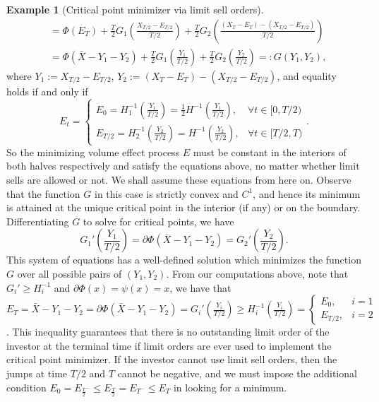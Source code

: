 \documentclass[openany,oneside]{article}
\theoremstyle{definition}
\newtheorem{eg}[thm]{Example}
\theoremstyle{remark}
\begin{document}
\begin{eg}[Critical point minimizer via limit sell orders]
\begin{align*}
&= \Phi(E_T) + \frac{T}{2} G_1\left(\frac{X_{T/2} - E_{T/2}}{T/2}\right) + \frac{T}{2} G_2\left(\frac{(X_T - E_T) - (X_{T/2} - E_{T/2})}{T/2}\right) \\
&= \Phi(\bar{X}-Y_1-Y_2) + \frac{T}{2} G_1\left(\frac{Y_1}{T/2}\right) + \frac{T}{2} G_2\left(\frac{Y_2}{T/2}\right) =: G(Y_1, Y_2),
\end{align*}
where $Y_1 := X_{T/2} - E_{T/2}$, $Y_2 := (X_T - E_T) - (X_{T/2} - E_{T/2})$, and equality holds if and only if
$$E_t =
\begin{cases} E_0 = H_1^{-1}\left( \frac{Y_1}{T/2} \right) = \frac{1}{2} H^{-1}\left( \frac{Y_1}{T/2} \right) , & \forall t\in[0,T/2) \\
E_{T/2} = H_2^{-1}\left( \frac{Y_2}{T/2} \right) = H^{-1}\left( \frac{Y_2}{T/2} \right), & \forall t\in[T/2,T)
\end{cases}.$$
So the minimizing volume effect process $E$ must be constant in the interiors of both halves respectively and satisfy the equations above, no matter whether limit sells are allowed or not. We shall assume these equations from here on. Observe that the function $G$ in this case is strictly convex and $C^1$, and hence its minimum is attained at the unique critical point in the interior (if any) or on the boundary. Differentiating $G$ to solve for critical points, we have
$$G_1'\left(\frac{Y_1}{T/2}\right) = \partial \Phi(\bar{X}-Y_1-Y_2) = G_2'\left(\frac{Y_2}{T/2}\right).$$
This system of equations has a well-defined solution which minimizes the function $G$ over all possible pairs of $(Y_1, Y_2)$. From our computations above, note that $G_i' \ge H_i^{-1}$ and $\partial \Phi(x) = \psi(x) = x$, we have that $E_T = \bar{X}-Y_1-Y_2 = \partial \Phi(\bar{X}-Y_1-Y_2) = G_i'\left(\frac{Y_i}{T/2}\right) \ge H_i^{-1}\left(\frac{Y_i}{T/2}\right) = \begin{cases} E_0, & i=1 \\ E_{T/2}, & i=2 \end{cases}$. This inequality guarantees that there is no outstanding limit order of the investor at the terminal time if limit orders are ever used to implement the critical point minimizer. If the investor cannot use limit sell orders, then the jumps at time $T/2$ and $T$ cannot be negative, and we must impose the additional condition $E_0 = E_{\frac{T}{2}^-}\le E_{\frac{T}{2}} = E_{T^-} \le E_T$ in looking for a minimum.


\end{eg}
\end{document}
